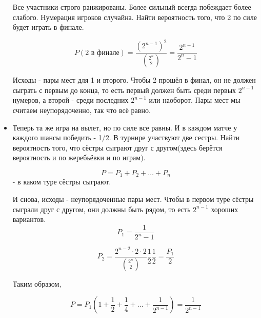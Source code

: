 \begin{itemize}
	Все участники строго ранжированы. Более сильный всегда побеждает более слабого. Нумерация игроков случайна. Найти вероятность того, что 2 по силе будет играть в финале.
	
	\[P(\text{2 в финале}) = \frac{(2^{n - 1})^2}{\binom{2^n}{2}} = \frac{2^{n - 1}}{2^n - 1}\]
	
	Исходы - пары мест для 1 и второго. Чтобы 2 прошёл в финал, он не должен сыграть с первым до конца, то есть первый должен быть среди первых $2^{n - 1}$ нумеров, а второй - среди последних $2^{n - 1}$ или наоборот. Пары мест мы считаем неупорядоченно, так что всё равно.
	\item Теперь та же игра на вылет, но по силе все равны. И в каждом матче у каждого шансы победить - 1/2. В турнире участвуют две сестры. Найти вероятность того, что сёстры сыграют друг с другом(здесь берётся вероятность и по жеребьёвки и по играм).
	
	\[P = P_1 + P_2 + \dots + P_n\] - в каком туре сёстры сыграют.
	
	И снова, исходы - неупорядоченные пары мест. Чтобы в первом туре сёстры сыграли друг с другом, они должны быть рядом, то есть $2^{n - 1}$ хороших вариантов.
	\[P_1 = \frac{1}{2^n - 1} \]
	
	\[P_2 = \frac{2^{n - 2} \cdot 2 \cdot 2}{\binom{2^n}{2}}\frac{1}{2}\frac{1}{2} = \frac{P_1}{2} \]
	
	Таким образом, 
	
	\[P = P_1(1 + \frac{1}{2} + \frac{1}{4} + \dots + \frac{1}{2^{n - 1}}) = \frac{1}{2^{n - 1}}\]
\end{itemize}

